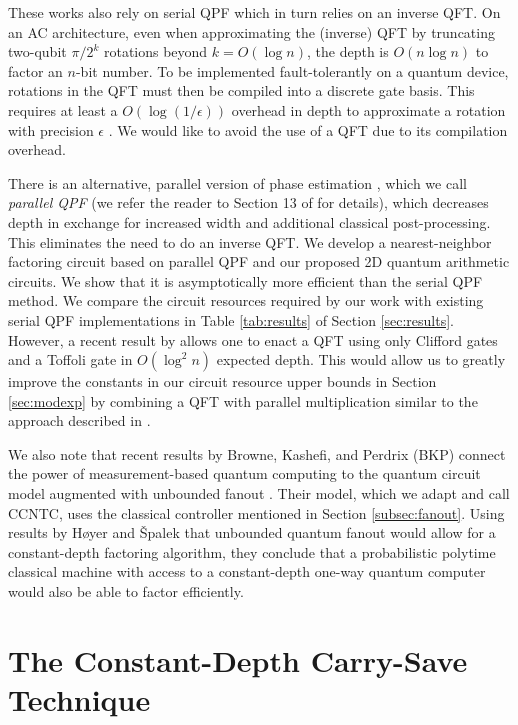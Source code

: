 \documentclass[twoside]{article}
\begin{document}
These works also rely on serial QPF which in turn relies on an inverse QFT.
On an AC architecture, even when approximating the (inverse) QFT by truncating two-qubit
$\pi/2^k$ rotations beyond $k = O(\log n)$, 
the depth is $O(n \log n)$ to factor an $n$-bit number.
To be implemented fault-tolerantly on a quantum device, rotations in the QFT must then be compiled into a discrete gate basis.
This requires at least a $O(\log(1/\epsilon))$ overhead in depth to approximate a rotation with precision $\epsilon$ \cite{Harrow02, Kitaev2002}.
We would like to avoid the use of a QFT due to its compilation overhead.

There is an alternative, parallel version of phase estimation 
\cite{Cleve2000,Kitaev2002}, which we call \emph{parallel QPF} (we refer the reader to Section 13 of \cite{Kitaev2002} for details), which decreases depth in exchange
for increased width and additional classical post-processing.
This eliminates the need to do an inverse QFT.
We develop a nearest-neighbor factoring circuit based on parallel QPF and our proposed 2D quantum arithmetic circuits.
We show that it is asymptotically more efficient than the serial QPF method. 
We compare the circuit resources required by our work with existing serial QPF implementations in Table
\ref{tab:results} of Section \ref{sec:results}.
However, a recent result by \cite{Jones2013} allows one to enact a
QFT using only Clifford gates and a Toffoli gate in $O(\log^2 n)$ expected depth.
This would allow us to
greatly improve the constants in our circuit resource upper bounds in Section \ref{sec:modexp} by combining a QFT with parallel multiplication similar to
the approach described in \cite{VanMeter2005,Cleve2000}.


We also note that recent results by Browne, Kashefi, and Perdrix (BKP) connect the power of
measurement-based quantum computing to the quantum circuit model augmented with
unbounded fanout \cite{Browne2009}. Their model, which we adapt and call
\textsc{CCNTC}, uses the classical controller mentioned in Section \ref{subsec:fanout}.
Using results by H{\o}yer and {\v S}palek \cite{Hoyer2002} that
unbounded quantum fanout would allow for a constant-depth factoring algorithm,
they conclude that a probabilistic polytime classical machine with access
to a constant-depth one-way quantum computer would also be able to factor
efficiently.

%
\section{The Constant-Depth Carry-Save Technique}
\label{sec:csa}
\end{document}

